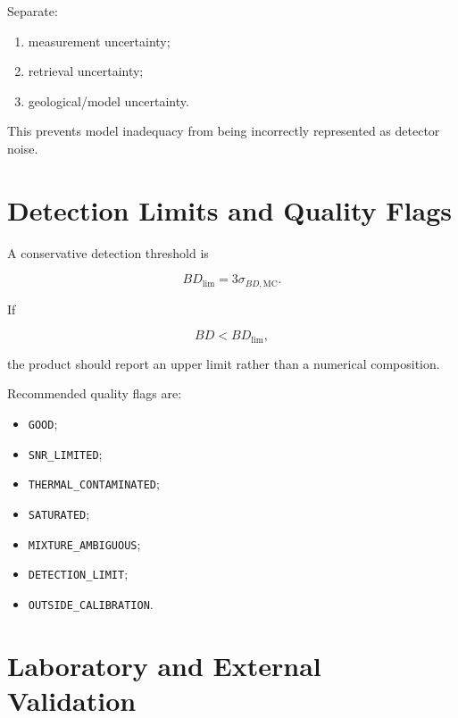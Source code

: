 \documentclass[11pt,a4paper]{article}
\begin{document}
Separate:

\begin{enumerate}
    \item measurement uncertainty;
    \item retrieval uncertainty;
    \item geological/model uncertainty.
\end{enumerate}

This prevents model inadequacy from being incorrectly represented as detector noise.

\section{Detection Limits and Quality Flags}

A conservative detection threshold is

\begin{equation}
BD_{\mathrm{lim}}
=
3\sigma_{BD,\mathrm{MC}}.
\end{equation}

If

\begin{equation}
BD < BD_{\mathrm{lim}},
\end{equation}

the product should report an upper limit rather than a numerical composition.

Recommended quality flags are:

\begin{itemize}
    \item \texttt{GOOD};
    \item \texttt{SNR\_LIMITED};
    \item \texttt{THERMAL\_CONTAMINATED};
    \item \texttt{SATURATED};
    \item \texttt{MIXTURE\_AMBIGUOUS};
    \item \texttt{DETECTION\_LIMIT};
    \item \texttt{OUTSIDE\_CALIBRATION}.
\end{itemize}

\section{Laboratory and External Validation}
\end{document}
